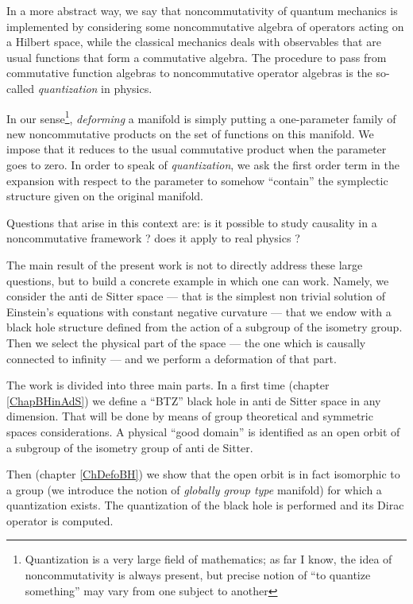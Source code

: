 In a more abstract way, we say that noncommutativity of quantum mechanics is implemented by considering some noncommutative algebra of operators acting on a Hilbert space, while the classical mechanics deals with observables that are usual functions that form a commutative algebra. The procedure to pass from commutative function algebras to noncommutative operator algebras is the so-called \emph{quantization} in physics.

In our sense\footnote{Quantization is a very large field of mathematics; as far I know, the idea of noncommutativity is always present, but precise notion of ``to quantize something'' may vary from one subject to another}, \emph{deforming} a manifold is simply putting a one-parameter family of new noncommutative products on the set of functions on this manifold. We impose that it reduces to the usual commutative product when the parameter goes to zero. In order to speak of \emph{quantization}, we ask the first order term in the expansion with respect to the parameter to somehow ``contain'' the symplectic structure given on the original manifold.

Questions that arise in this context are: is it possible to study causality in a noncommutative framework ? does it apply to real physics ?

The main result of the present work is not to directly address these large questions, but to build a concrete example in which one can work. Namely, we consider the anti de Sitter space --- that is the simplest non trivial solution of Einstein's equations with constant negative curvature --- that we endow with a black hole structure defined from the action of a subgroup of the isometry group. Then we select the physical part of the space --- the one which is causally connected to infinity --- and we perform a deformation of that part.

The work is divided into three main parts. In a first  time (chapter \ref{ChapBHinAdS}) we define a ``BTZ'' black hole in anti de Sitter space in any dimension. That will be done by means of group theoretical and symmetric spaces considerations. A physical ``good domain'' is identified as an open orbit of a subgroup of the isometry group of anti de Sitter. 

Then (chapter \ref{ChDefoBH}) we show that the open orbit is in fact isomorphic to a group (we introduce the notion of \emph{globally group type} manifold) for which a quantization exists. The quantization of the black hole is performed and its Dirac operator is computed.

